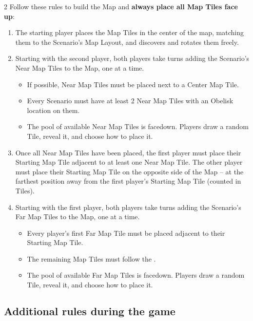 \begin{multicols}{2}
Follow these rules to build the Map and \textbf{always place all Map Tiles face up}:
\begin{enumerate}
  \item The starting player places the Map Tiles in the center of the map, matching them to the Scenario's Map Layout, and discovers and rotates them freely.
\columnbreak
  \item Starting with the second player, both players take turns adding the Scenario's Near Map Tiles to the Map, one at a time.
  \begin{itemize}
    \item If possible, Near Map Tiles must be placed next to a Center Map Tile.
    \item Every Scenario must have at least 2 Near Map Tiles with an Obelisk location on them.
    \item The pool of available Near Map Tiles is facedown. Players draw a random Tile, reveal it, and choose how to place it.
  \end{itemize}
  \item Once all Near Map Tiles have been placed, the first player must place their Starting Map Tile adjacent to at least one Near Map Tile.
    The other player must place their Starting Map Tile on the opposite side of the Map -- at the farthest position away from the first player's Starting Map Tile (counted in Tiles).
  \item Starting with the first player, both players take turns adding the Scenario's Far Map Tiles to the Map, one at a time.
  \begin{itemize}
    \item Every player's first Far Map Tile must be placed adjacent to their Starting Map Tile.
    \item The remaining Map Tiles must follow the .
    \item The pool of available Far Map Tiles is facedown. Players draw a random Tile, reveal it, and choose how to place it.
  \end{itemize}
\end{enumerate}

\subsection*{Additional rules during the game}


\end{multicols}
